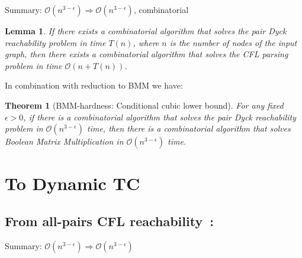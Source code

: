\documentclass{amsart}
\newtheorem*{theorem}{Theorem}
\newtheorem*{lemma}{Lemma}
\begin{document}
	Summary: $\mathcal{O}(n^{3 - \epsilon}) \Rightarrow \mathcal{O}(n^{3 - \epsilon})$, combinatorial
	
	\begin{lemma}
		If there exists a combinatorial algorithm that solves the pair Dyck reachability problem in time $T(n)$, where $n$ is the number of nodes of the input graph, then there exists a combinatorial
		algorithm that solves the CFL parsing problem in time $\mathcal{O}(n +T(n))$.
	\end{lemma}
	
	In combination with reduction to BMM we have:
	
	\begin{theorem}[BMM-hardness: Conditional cubic lower bound] 
		For any fixed $\epsilon > 0$, if there is a combinatorial algorithm that solves the pair Dyck reachability problem in $\mathcal{O}(n^{3 - \epsilon})$ time, then
		there is a combinatorial algorithm that solves Boolean Matrix Multiplication in $\mathcal{O}(n^{3 - \epsilon})$ time.
	\end{theorem}
	
	\section{To Dynamic TC}
	
	\subsection{From all-pairs CFL reachability~\cite{inbook}:\\}
	\label{dtc_to_cfl}
	
	Summary: $\mathcal{O}(n^{3 - \epsilon}) \Rightarrow \mathcal{O}(n^{3 - \epsilon})$
	
	\newpage
	
\end{document}
